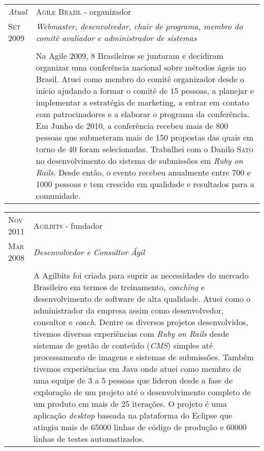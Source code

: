 \documentclass[letter,10pt]{article}
\begin{document}
\begin{tabular}{p{2.5cm}|p{13.5cm}}
  \emph{Atual} & \textsc{Agile Brazil} - organizador\\
  \textsc{Set 2009}& \emph{Webmaster, desenvolvedor, \textit{chair} de programa, membro do comitê avaliador e administrador de sistemas}\\
  &\\
  & Na Agile 2009, 8 Brasileiros se juntaram e decidiram organizar
  uma conferência nacional sobre métodos ágeis no Brasil. Atuei como
  membro do comitê organizador desde o início ajudando a formar o
  comitê de 15 pessoas, a planejar e implementar a estratégia de
  marketing, a entrar em contato com patrocinadores e a elaborar o
  programa da conferência. Em Junho de 2010, a conferência
  recebeu mais de 800 pessoas que submeteram mais de 150 propostas das
  quais em torno de 40 foram selecionadas. Trabalhei com o Danilo
  \textsc{Sato} no desenvolvimento do sistema de submissões em
  \textit{Ruby on Rails}. Desde então, o evento recebeu anualmente
  entre 700 e 1000 pessoas e tem crescido em qualidade e resultados
  para a comunidade.
\end{tabular}

\begin{tabular}{p{2.5cm}|p{13.5cm}}
  \textsc{Nov 2011} & \textsc{Agilbits} - fundador\\
  \textsc{Mar 2008}& \emph{Desenvolvedor e Consultor Ágil}\\
  &\\
  &A Agilbits foi criada para suprir as necessidades do mercado
  Brasileiro em termos de treinamento, \textit{coaching} e
  desenvolvimento de software de alta qualidade. Atuei como o
  administrador da empresa assim como desenvolvedor, consultor e
  \textit{coach}.
  Dentre os diversos projetos desenvolvidos, tivemos diversas
  experiências com \textit{Ruby on Rails} desde sistemas de gestão de
  conteúdo (\textit{CMS}) simples até processamento de imagens e
  sistemas de submissões.
  Também tivemos experiências em Java onde atuei como membro de uma
  equipe de 3 a 5 pessoas que liderou desde a fase de exploração de
  um projeto até o desenvolvimento completo de um produto em mais de
  25 iterações. O projeto é uma aplicação \textit{desktop} baseada na
  plataforma do Eclipse que atingiu mais de 65000 linhas de código de
  produção e 60000 linhas de testes automatizados.
\end{tabular}
\end{document}
